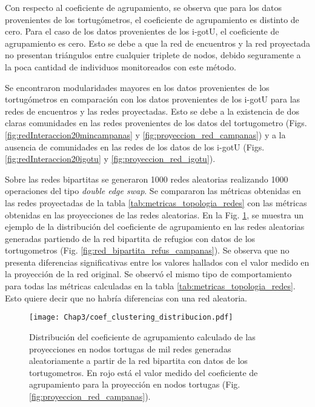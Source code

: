 Con respecto al coeficiente de agrupamiento, se observa que para los datos provenientes de los tortugómetros, el coeficiente de agrupamiento es distinto de cero. Para el caso de los datos provenientes de los i-gotU, el coeficiente de agrupamiento es cero. Esto se debe a que la red de encuentros y la red proyectada no presentan triángulos entre cualquier triplete de nodos, debido seguramente a la poca cantidad de individuos monitoreados con este método. 

Se encontraron modularidades mayores en los datos provenientes de los tortugómetros en comparación con los datos provenientes de los i-gotU para las redes de encuentros y las redes proyectadas. Esto se debe a la existencia de dos claras comunidades en las redes provenientes de los datos del tortugometro (Figs. \ref{fig:redInteraccion20mincampanas} y \ref{fig:proyeccion_red_campanas}) y a la ausencia de comunidades en las redes de los datos de los i-gotU (Figs. \ref{fig:redInteraccion20igotu} y \ref{fig:proyeccion_red_igotu}).
 
Sobre las redes bipartitas se generaron 1000 redes aleatorias  realizando 1000 operaciones del tipo \textit{double edge swap}. Se compararon las métricas obtenidas en las redes proyectadas de la tabla \ref{tab:metricas_topologia_redes} con las métricas obtenidas en las proyecciones de las redes aleatorias. En la Fig. \ref{fig:distribucion_coef_agrupa}, se muestra un ejemplo de la distribución del coeficiente de agrupamiento en las redes aleatorias generadas partiendo de la red bipartita de refugios con datos de los tortugometros (Fig. \ref{fig:red_bipartita_refus_campanas}). Se observa que no presenta diferencias significativas entre los valores hallados con el valor medido en la proyección de la red original. Se observó el mismo tipo de comportamiento para todas las métricas calculadas en la tabla \ref{tab:metricas_topologia_redes}. Esto quiere decir que no habría diferencias con una red aleatoria.
\begin{figure}[ht]
    \begin{center}
        \texttt{[image: Chap3/coef\_clustering\_distribucion.pdf]}
        \caption[Distribución del coeficiente de agrupamiento en proyecciones de redes aleatorias.]{Distribución del coeficiente de agrupamiento calculado de las proyecciones en nodos tortugas de mil redes generadas aleatoriamente a partir de la red bipartita con datos de los tortugometros. En rojo está el valor medido del coeficiente de agrupamiento para la proyección en nodos tortugas (Fig. \ref{fig:proyeccion_red_campanas}).}
        \label{fig:distribucion_coef_agrupa}
       
        \end{center}
\end{figure}
 
